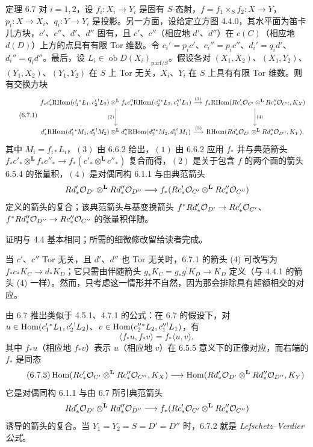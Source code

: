 \begin{statement}{定理 6.7}
对 $i=1,2$，设 $f_i:X_i\to Y_i$ 是固有 $S$-态射，$f=f_1\times_Sf_2:X\to Y$，$p_i:X\to X_i$、$q_i:Y\to Y_i$ 是投影。另一方面，设给定立方图 4.4.0，其水平面为笛卡儿方块，$c'$、$c''$、$d'$、$d''$ 固有，且 $c'$、$c''$（相应地 $d'$、$d''$）在 $c(C)$（相应地 $d(D)$）上方的点具有有限 Tor 维数。令 $c_i'=p_ic'$、$c_i''=p_ic''$、$d_i'=q_id'$、$d_i''=q_id''$。最后，设 $L_i\in\operatorname{ob}D(X_i)_{\mathrm{parf}/S}$。假设各对 $(X_1,X_2)$、$(X_1,Y_2)$、$(Y_1,X_2)$、$(Y_1,Y_2)$ 在 $S$ 上 Tor 无关，$X_i$、$Y_i$ 在 $S$ 上具有有限 Tor 维数。则有交换方块
\begin{equation}
\tag{6.7.1}
\begin{tikzcd}[column sep=small,row sep=large]
f_*c'_*\RHom(c_1'{}^*L_1,c_2'{}^!L_2)\otimes^{\mathbf L} f_*c''_*\RHom(c_2''{}^*L_2,c_1''{}^!L_1) \arrow[r,"(1)"] \arrow[d,"(2)"']
& f_*\RHom(Rc'_*\cO_{C'}\otimes^{\mathbf L}Rc''_*\cO_{C''},K_X) \arrow[d,"(4)"] \\
d'_*\RHom(d_1'{}^*M_1,d_2'{}^!M_2)\otimes^{\mathbf L} d''_*\RHom(d_2''{}^*M_2,d_1''{}^!M_1) \arrow[r,"(3)"]
& \RHom(Rd'_*\cO_{D'}\otimes^{\mathbf L}Rd''_*\cO_{D''},K_Y),
\end{tikzcd}
\end{equation}
其中 $M_i=f_{i*}L_i$，$(3)$ 由 6.6.2 给出，$(1)$ 由 6.6.2 应用 $f_*$ 并与典范箭头 $f_*c'_*\otimes^{\mathbf L} f_*c''_*\to f_*(c'_*\otimes^{\mathbf L} c''_*)$ 复合而得，$(2)$ 是关于包含 $f$ 的两个面的箭头 6.5.4 的张量积，$(4)$ 是对偶同构 6.1.1 与由典范箭头
\[
Rd'_*\mathcal{O}_{D'}\otimes^{\mathbf L}Rd''_*\mathcal{O}_{D''}\longrightarrow f_*(Rc'_*\mathcal{O}_{C'}\otimes^{\mathbf L}Rc''_*\mathcal{O}_{C''})
\]
定义的箭头的复合；该典范箭头与基变换箭头 $f^*Rd'_*\mathcal{O}_{D'}\to Rc'_*\mathcal{O}_{C'}$、$f^*Rd''_*\mathcal{O}_{D''}\to Rc''_*\mathcal{O}_{C''}$ 的张量积伴随。
\end{statement}

证明与 4.4 基本相同；所需的细微修改留给读者完成。

当 $c'$、$c''$ Tor 无关，且 $d'$、$d''$ 也 Tor 无关时，6.7.1 的箭头 (4) 可改写为 $f_*c_*K_C\to d_*K_D$；它只需由伴随箭头 $g_*K_C=g_*g^!K_D\to K_D$ 定义（与 4.4.1 的箭头 (4) 一样）。然而，只考虑这一情形并不自然，因为那会排除具有超额相交的对应。

由 6.7 推出类似于 4.5.1、4.7.1 的公式：在 6.7 的假设下，对 $u\in\operatorname{Hom}(c_1'{}^*L_1,c_2'{}^!L_2)$、$v\in\operatorname{Hom}(c_2''{}^*L_2,c_1''{}^!L_1)$，有
\begin{equation}
\tag{6.7.2}
\langle f_*u,f_*v\rangle=f_*\langle u,v\rangle,
\end{equation}
其中 $f_*u$（相应地 $f_*v$）表示 $u$（相应地 $v$）在 6.5.5 意义下的正像对应，而右端的 $f_*$ 是同态
\begin{equation}
\tag{6.7.3}
\operatorname{Hom}(Rc'_*\mathcal{O}_{C'}\otimes^{\mathbf L}Rc''_*\mathcal{O}_{C''},K_X)
\longrightarrow
\operatorname{Hom}(Rd'_*\mathcal{O}_{D'}\otimes^{\mathbf L}Rd''_*\mathcal{O}_{D''},K_Y)
\end{equation}
它是对偶同构 6.1.1 与由 6.7 所引典范箭头
\[
Rd'_*\mathcal{O}_{D'}\otimes^{\mathbf L}Rd''_*\mathcal{O}_{D''}\longrightarrow f_*(Rc'_*\mathcal{O}_{C'}\otimes^{\mathbf L}Rc''_*\mathcal{O}_{C''})
\]
诱导的箭头的复合。当 $Y_1=Y_2=S=D'=D''$ 时，6.7.2 就是 \emph{Lefschetz--Verdier 公式}。

